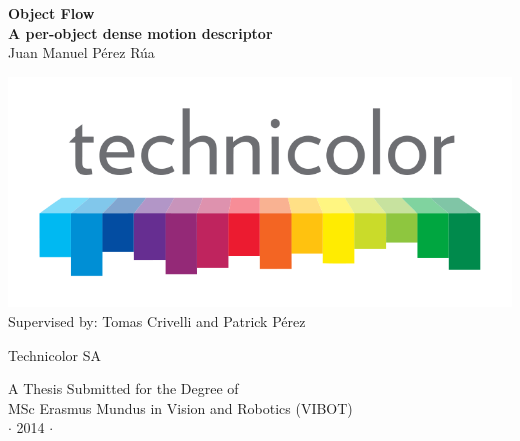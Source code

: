 
\newpage
\thispagestyle{empty}


\vspace*{1cm}
\begin{center}
{\huge\bf Object Flow\\}
{\large\bf A per-object dense motion descriptor\\}
\vspace{2cm} 
{\large Juan Manuel P\'erez R\'ua\\}
\vspace{1cm} 

\includegraphics[height=0.185\textheight]{images/logo/technicolor_large.png} \\

\vspace{1cm}
Supervised by: Tomas Crivelli and Patrick P\'erez

\vspace{1cm} 
\normalsize{Technicolor SA \\}%
\end{center}

\vspace{2cm}
\begin{center}
{\large A Thesis Submitted for the Degree of \\MSc Erasmus Mundus
in Vision and Robotics (VIBOT) \\\vspace{0.3cm} $\cdot$ 2014
$\cdot$}
\end{center}
\singlespacing
